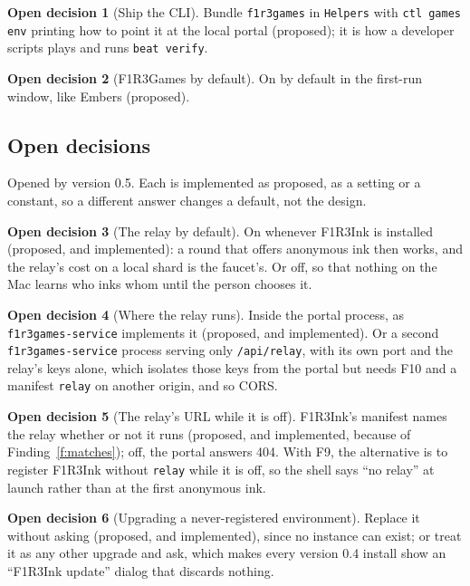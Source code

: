 \documentclass[11pt]{article}
\theoremstyle{definition}
\newtheorem{decision}{Open decision}
\theoremstyle{remark}
\newcommand{\code}[1]{\texttt{#1}}
\newcommand{\Gm}{F1R3Games}
\newcommand{\Svc}{\code{f1r3games-service}}
\newcommand{\Em}{Embers}
\begin{document}
\begin{decision}[Ship the CLI]\label{dec:cli}
Bundle \code{f1r3games} in \code{Helpers} with \code{ctl games env} printing how to
point it at the local portal (proposed); it is how a developer scripts plays and runs
\code{beat verify}.
\end{decision}

\begin{decision}[\Gm{} by default]\label{dec:default}
On by default in the first-run window, like \Em{} (proposed).
\end{decision}

\subsection{Open decisions}

Opened by version 0.5. Each is implemented as proposed, as a setting or a constant,
so a different answer changes a default, not the design.

\begin{decision}[The relay by default]\label{dec:relayon}
On whenever F1R3Ink is installed (proposed, and implemented): a round that offers
anonymous ink then works, and the relay's cost on a local shard is the faucet's. Or
off, so that nothing on the Mac learns who inks whom until the person chooses it.
\end{decision}

\begin{decision}[Where the relay runs]\label{dec:relayproc}
Inside the portal process, as \Svc{} implements it (proposed, and implemented). Or a
second \Svc{} process serving only \code{/api/relay}, with its own port and the relay's
keys alone, which isolates those keys from the portal but needs F10 and a manifest
\code{relay} on another origin, and so CORS.
\end{decision}

\begin{decision}[The relay's URL while it is off]\label{dec:relayurl}
F1R3Ink's manifest names the relay whether or not it runs (proposed, and implemented,
because of Finding~\ref{f:matches}); off, the portal answers 404. With F9, the
alternative is to register F1R3Ink without \code{relay} while it is off, so the shell
says ``no relay'' at launch rather than at the first anonymous ink.
\end{decision}

\begin{decision}[Upgrading a never-registered environment]\label{dec:silent}
Replace it without asking (proposed, and implemented), since no instance can exist;
or treat it as any other upgrade and ask, which makes every version 0.4 install show
an ``F1R3Ink update'' dialog that discards nothing.
\end{decision}
\end{document}
